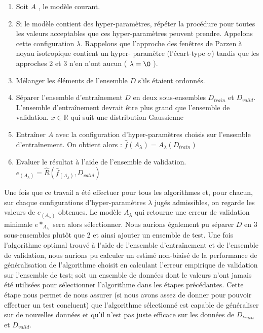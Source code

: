 \documentclass[a4paper,10pt]{article}
\begin{document}
\begin{enumerate}
	\item Soit $A$ , le modèle courant.
	\item Si le modèle contient des hyper-paramètres, répéter la procédure pour toutes les valeurs acceptables que ces hyper-paramètres peuvent prendre. Appelons cette configuration $\lambda$. Rappelons que l'approche des fenêtres de Parzen à noyau isotropique contient un hyper- paramètre (l'écart-type $\sigma$) tandis que les approches 2 et 3 n'en n'ont aucun ( $\lambda= \O$ ).
	\item Mélanger les éléments de l'ensemble $D$ s'ils étaient ordonnés.
	\item Séparer l'ensemble d'entraînement $D$ en deux sous-ensembles $D_{train}$ et $D_{valid}$. L'ensemble d’entraînement devrait être plus grand que l'ensemble de validation. $x \in \mathds{R}$ qui suit une distribution Gaussienne
	\item Entraîner $A$ avec la configuration d'hyper-paramètres choisis sur l'ensemble d'entraînement. On obtient alors : $\widehat{f} (A_{\lambda})=A_{\lambda}(D_{train})$
	\item Evaluer le résultat à l'aide de l'ensemble de validation. $e_{(A_{\lambda})} = \widehat{R} ( \widehat{f}_{(A_{\lambda})} , D_{valid} )$
\end{enumerate}

Une fois que ce travail a été effectuer pour tous les algorithmes et, pour chacun, sur chaque configurations d'hyper-paramètres $\lambda$ jugés admissibles, on regarde les valeurs de $e_{(A_{\lambda})}$ obtenues. Le modèle $A_{\lambda}$ qui retourne une erreur de validation minimale $e*_{A_{\lambda}}$ sera alors sélectionner. 
Nous aurions également pu séparer $D$ en 3 sous-ensembles plutôt que 2 et ainsi ajouter un ensemble de test. Une fois l'algorithme optimal trouvé à l'aide de l'ensemble d'entraînement et de l'ensemble de validation, nous aurions pu calculer un estimé non-biaisé de la performance de généralisation de l'algorithme choisit en calculant l'erreur empirique de validation sur l'ensemble de test; soit un ensemble de données dont le valeurs n'ont jamais été utilisées pour sélectionner l'algorithme dans les étapes précédantes. Cette étape nous permet de nous assurer (si nous avons assez de donner pour pouvoir effectuer un test concluent) que l'algorithme sélectionné est capable de généraliser sur de nouvelles données et qu'il n'est pas juste efficace sur les données de $D_{train}$ et $D_{valid}$.
\end{document}
